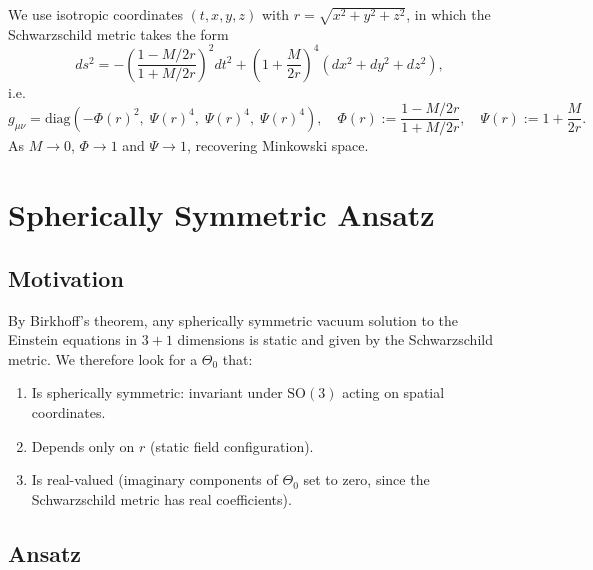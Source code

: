 \documentclass[11pt,a4paper]{article}
\theoremstyle{definition}
\theoremstyle{remark}
\begin{document}
We use isotropic coordinates $(t, x, y, z)$ with $r = \sqrt{x^2+y^2+z^2}$,
in which the Schwarzschild metric takes the form
\begin{equation}
  ds^2
  = -\left(\frac{1 - M/2r}{1 + M/2r}\right)^2 dt^2
  + \left(1 + \frac{M}{2r}\right)^4
    \left(dx^2 + dy^2 + dz^2\right),
  \label{eq:schwarz_isotropic}
\end{equation}
i.e.\
\begin{equation}
  g_{\mu\nu} = \mathrm{diag}\!\left(
    -\Phi(r)^2,\;
    \Psi(r)^4,\;
    \Psi(r)^4,\;
    \Psi(r)^4
  \right),
  \quad
  \Phi(r) := \frac{1 - M/2r}{1 + M/2r},
  \quad
  \Psi(r) := 1 + \frac{M}{2r}.
  \label{eq:schwarz_components}
\end{equation}
As $M \to 0$, $\Phi \to 1$ and $\Psi \to 1$, recovering Minkowski space.

\section{Spherically Symmetric Ansatz}
\label{sec:ansatz}

\subsection{Motivation}

By Birkhoff's theorem, any spherically symmetric vacuum solution to the
Einstein equations in $3+1$ dimensions is static and given by the Schwarzschild
metric.  We therefore look for a $\Theta_0$ that:
\begin{enumerate}
  \item Is spherically symmetric: invariant under $\mathrm{SO}(3)$ acting on
        spatial coordinates.
  \item Depends only on $r$ (static field configuration).
  \item Is real-valued (imaginary components of $\Theta_0$ set to zero, since
        the Schwarzschild metric has real coefficients).
\end{enumerate}

\subsection{Ansatz}
\end{document}
